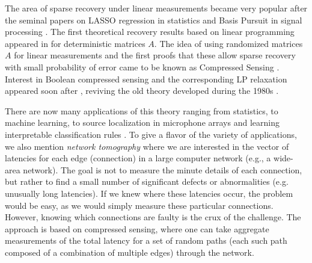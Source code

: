 The area of sparse recovery under linear measurements became very popular after the seminal 
papers on LASSO regression \cite{tibshirani1996regression} in statistics and Basis Pursuit in signal processing 
\cite{basis_pursuit}. The first theoretical recovery results based on linear programming appeared in 
\cite{donoho2001uncertainty} for deterministic matrices $A$.  The idea of using randomized matrices $A$ for linear measurements and the first proofs that these allow sparse recovery with small probability of error came to be known as Compressed Sensing \cite{donoho2006compressed}. Interest in Boolean compressed sensing and the corresponding LP relaxation appeared soon after \cite{atia2012boolean, malioutov2012boolean}, reviving the old theory developed during the 1980s \cite{Malyutov78}.

There are now many applications of this theory ranging from statistics, to machine 
learning, to source localization in microphone arrays \cite{malioutov2005sparse} and learning
interpretable classification rules \cite{malioutov2013exact}. To give
a flavor of the variety of applications, we also mention {\em network tomography} \cite{vardi1996network_tomography} where we are interested in the vector of latencies for each edge (connection) in a large
computer network (e.g., a wide-area network). The goal is not to measure the minute details of each connection, but rather to find a small number of significant defects or abnormalities (e.g. unusually long latencies). If we knew where these latencies occur, the problem would be easy, as we would simply measure these particular connections. However, knowing which connections are faulty is the crux of the challenge. The approach is based on compressed sensing, where one can take aggregate measurements of the total latency for a set of random paths (each such path composed of a combination of multiple edges) through the network.

